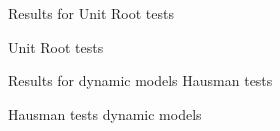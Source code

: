 \documentclass[]{article}
\begin{document}
Results for Unit Root tests
\begin{landscape}
\begin{table}[ht]
	\centering
	
	\caption{Unit Root tests \label{tab:AppUnitRoots}} 
	
	
\end{table}
\end{landscape}




Results for dynamic models Hausman tests

\begin{table}[ht]
	\centering

\caption{Hausman tests dynamic models \label{tab:AppendixHausman}} 


\end{table}
\end{document}
